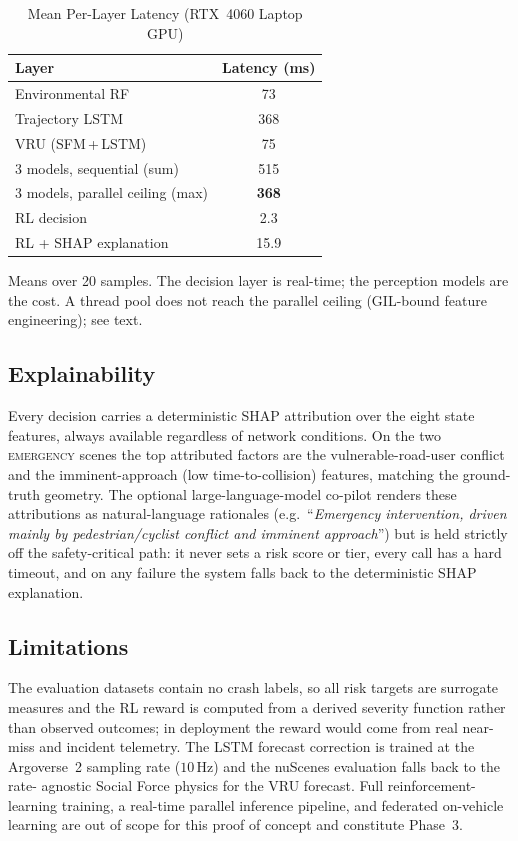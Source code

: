 \begin{table}[htbp]
\caption{Mean Per-Layer Latency (RTX~4060 Laptop GPU)}
\label{tab:phase2_latency}
\centering
\begin{tabular}{lc}
\toprule
\textbf{Layer} & \textbf{Latency (ms)} \\
\midrule
Environmental RF       & 73 \\
Trajectory LSTM        & 368 \\
VRU (SFM\,+\,LSTM)     & 75 \\
\midrule
3 models, sequential (sum)   & 515 \\
3 models, parallel ceiling (max) & \textbf{368} \\
\midrule
RL decision            & 2.3 \\
RL + SHAP explanation  & 15.9 \\
\bottomrule
\end{tabular}
\vspace{2pt}
\footnotesize{Means over 20 samples. The decision layer is real-time; the
perception models are the cost. A thread pool does not reach the parallel ceiling
(GIL-bound feature engineering); see text.}
\end{table}

\subsection{Explainability}
Every decision carries a deterministic SHAP attribution over the eight state
features, always available regardless of network conditions. On the two
\textsc{emergency} scenes the top attributed factors are the vulnerable-road-user
conflict and the imminent-approach (low time-to-collision) features, matching the
ground-truth geometry. The optional large-language-model co-pilot renders these
attributions as natural-language rationales (e.g.\ ``\emph{Emergency intervention,
driven mainly by pedestrian/cyclist conflict and imminent approach}'') but is held
strictly off the safety-critical path: it never sets a risk score or tier, every
call has a hard timeout, and on any failure the system falls back to the
deterministic SHAP explanation.

\subsection{Limitations}
\label{subsec:limits}
The evaluation datasets contain no crash labels, so all risk targets are surrogate
measures and the RL reward is computed from a derived severity function rather than
observed outcomes; in deployment the reward would come from real near-miss and
incident telemetry. The LSTM forecast correction is trained at the Argoverse~2
sampling rate ($10$\,Hz) and the nuScenes evaluation falls back to the rate-
agnostic Social Force physics for the VRU forecast. Full reinforcement-learning
training, a real-time parallel inference pipeline, and federated on-vehicle
learning are out of scope for this proof of concept and constitute Phase~3.
